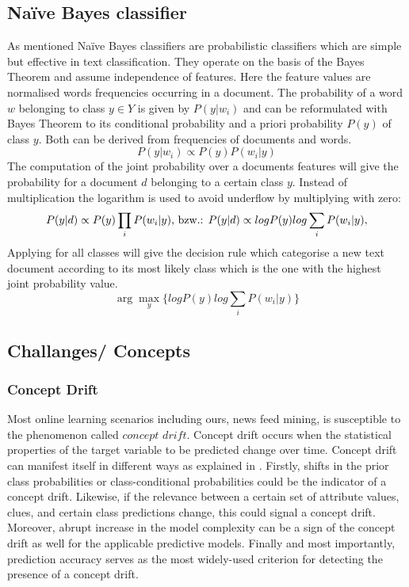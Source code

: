 \documentclass{article} %
\begin{document}
\subsection{Na\"ive Bayes classifier}
As mentioned Na\"ive Bayes classifiers are probabilistic classifiers which are simple but effective in text classification. They operate on the basis of the Bayes Theorem and assume independence of features. Here the feature values are normalised words frequencies occurring in a document. The probability of a word $w$ belonging to class $y \in Y$ is given by $P(y|w_i)$ and can be reformulated with Bayes Theorem to its conditional probability and a priori probability $ P(y)$ of class $y$. Both can be derived from frequencies of documents and words.
$$
P(y|w_i) \propto P(y)P(w_i|y)
$$
The computation of the joint probability over a documents features will give the probability for a  document $d$ belonging to a certain class $y$. Instead of multiplication the logarithm is used to avoid underflow by multiplying with zero:
$$
P(y|d) \propto P(y)\prod_i P(w_i|y)\space
\textrm{,  bzw.:    }
P(y|d) \propto log P(y) log \sum_i P(w_i|y),
$$
Applying for all classes will give the decision rule which categorise a new text document according to its most likely class which is the one with the highest joint probability value.
$$
\arg\max_y\{ log P(y) log \sum_i P(w_i|y)\}
$$

\subsection{Challanges/ Concepts}

\subsubsection{Concept Drift}
Most online learning scenarios including ours, news feed mining, is susceptible to the phenomenon called $concept$ $drift$. Concept drift occurs when the statistical properties of the target variable to be predicted change over time. Concept drift can manifest itself in different ways as explained in \cite[p. 1]{KunchevaEnsembleOverview08} . Firstly, shifts in the prior class probabilities or class-conditional probabilities could be the indicator of a concept drift. Likewise, if the relevance between a certain set of attribute values, clues, and certain class predictions change, this could signal a concept drift. Moreover, abrupt increase in the model complexity can be a sign of the concept drift as well for the applicable predictive models. Finally and most importantly, prediction accuracy serves as the most widely-used criterion for detecting the presence of a concept drift. 
\end{document}
